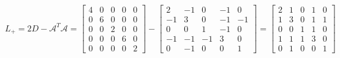     \begin{equation*}
        L_{+} = 2D - \mathcal{A}^T\mathcal{A} = \left[\begin{matrix}
            4 & 0 & 0 & 0 & 0\\
            0 & 6 & 0 & 0 & 0\\
            0 & 0 & 2 & 0 & 0\\
            0 & 0 & 0 & 6 & 0\\
            0 & 0 & 0 & 0 & 2
        \end{matrix}\right] - \left[\begin{matrix}
            2 & -1 & 0 & -1 & 0\\
            -1 & 3 & 0 & -1 & -1\\
            0 & 0 & 1 & -1 & 0\\
            -1 & -1 & -1 & 3 & 0\\
            0 & -1 & 0 & 0 & 1
        \end{matrix}\right] = \left[\begin{matrix}
            2 & 1 & 0 & 1 & 0\\
            1 & 3 & 0 & 1 & 1\\
            0 & 0 & 1 & 1 & 0\\
            1 & 1 & 1 & 3 & 0\\
            0 & 1 & 0 & 0 & 1
        \end{matrix}\right]
    \end{equation*}

